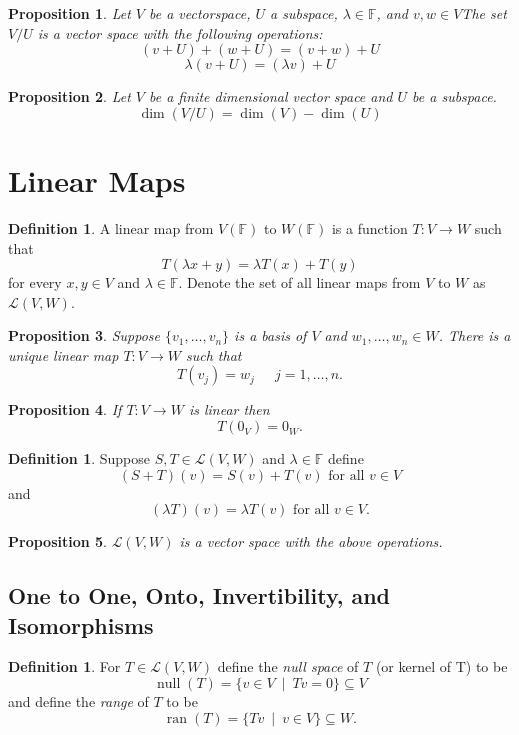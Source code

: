 \documentclass[12pt,letterpaper]{article}
\newcommand{\nul}{\operatorname {null}}
\newcommand{\ran}{\operatorname {ran}}
\theoremstyle{plain}
\newtheorem{proposition}{Proposition}[section]
\theoremstyle{definition}
\newtheorem{definition}[theorem]{Definition}
\numberwithin{equation}{section}
\begin{document}
\begin{proposition} Let $V$ be a vectorspace, $U$ a subspace, $\lambda\in \mathbb{F}$, and $v,w\in V$The set $V/U$ is a vector space with the following operations: 
\[(v+U)+(w+U)=(v+w)+U\]
\[\lambda(v+U)=(\lambda v)+U\]
\end{proposition}


\begin{proposition} Let $V$ be a finite dimensional vector space and $U$ be a subspace. 
\[\dim(V/U)=\dim(V)-\dim(U)\]
\end{proposition}

\section{Linear Maps}
\begin{definition} A linear map from $V(\mathbb{F})$ to $W(\mathbb{F})$ is a function $T:V\rightarrow W$ such that 
\[T(\lambda x+y)=\lambda T(x)+T(y)\]
for every $x,y\in V$ and $\lambda\in \mathbb{F}$. Denote the set of all linear maps from $V$ to $W$ as $\mathcal{L}(V,W)$. 
\end{definition}
\begin{proposition} Suppose $\{v_1,\ldots, v_n\}$ is a basis of $V$ and $w_1,\ldots,w_n\in W$. There is a unique linear map $T:V\rightarrow W$ such that 
\[T(v_j)=w_j\ \quad \ j=1,\ldots, n.\]
\end{proposition}

\begin{proposition} If $T:V\rightarrow W$ is linear then 
\[T(0_V)=0_W.\]
\end{proposition}

\begin{definition} Suppose $S, T\in \mathcal{L}(V,W)$ and $\lambda \in \mathbb{F}$ define 
\[(S+T)(v)=S(v)+T(v) \text{ for all }v\in V\]
and
\[(\lambda T)(v)=\lambda T(v) \text{ for all }v\in V.\]
\end{definition}
\begin{proposition} $\mathcal{L}(V,W)$ is a vector space with the above operations.
\end{proposition}
\subsection{One to One, Onto, Invertibility, and Isomorphisms}
\begin{definition} For $T\in \mathcal{L}(V,W)$ define the \emph{null space} of $T$ (or kernel of T) to be 
\[\nul(T)=\{v\in V\ \mid \  Tv=0\}\subseteq V\]
and define the \emph{range} of $T$ to be 
\[\ran(T)=\{Tv\ \mid \  v\in V\}\subseteq W.\]
\end{definition}
\end{document}
